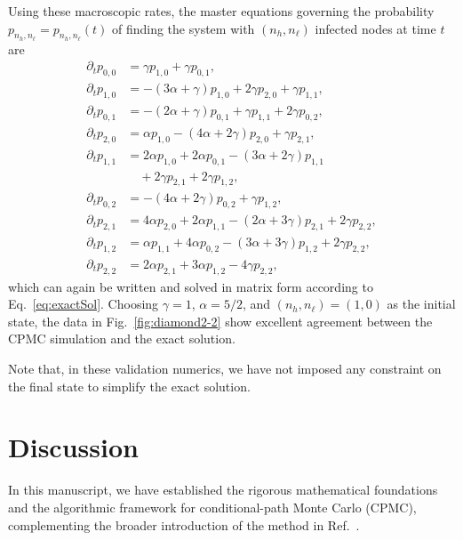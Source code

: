 \documentclass[english,10pt,aps,pra,twocolumn,superscriptaddress,floatfix,fleqn]{revtex4-2}
\begin{document}
Using these macroscopic rates, the master equations governing the probability $p_{n_h,n_\ell}=p_{n_h,n_\ell}(t)$ of finding the system with $(n_h,n_\ell)$ infected nodes at time $t$ are
\begin{align*}
	\partial_t p_{0,0} &= \gamma p_{1,0} + \gamma p_{0,1}, \\
	\partial_t p_{1,0} &= -(3\alpha + \gamma)p_{1,0} + 2\gamma p_{2,0} + \gamma p_{1,1}, \\
	\partial_t p_{0,1} &= -(2\alpha + \gamma)p_{0,1} + \gamma p_{1,1} + 2\gamma p_{0,2}, \\
	\partial_t p_{2,0} &= \alpha p_{1,0} - (4\alpha + 2\gamma)p_{2,0} + \gamma p_{2,1}, \\
	\partial_t p_{1,1} &= 2\alpha p_{1,0} + 2\alpha p_{0,1} - (3\alpha + 2\gamma)p_{1,1}\\
	&\quad+ 2\gamma p_{2,1} + 2\gamma p_{1,2}, \\
	\partial_t p_{0,2} &= -(4\alpha + 2\gamma)p_{0,2} + \gamma p_{1,2}, \\
	\partial_t p_{2,1} &= 4\alpha p_{2,0} + 2\alpha p_{1,1} - (2\alpha + 3\gamma)p_{2,1} + 2\gamma p_{2,2}, \\
	\partial_t p_{1,2} &= \alpha p_{1,1} + 4\alpha p_{0,2} - (3\alpha + 3\gamma)p_{1,2} + 2\gamma p_{2,2}, \\
	\partial_t p_{2,2} &= 2\alpha p_{2,1} + 3\alpha p_{1,2} - 4\gamma p_{2,2},
\end{align*}
which can again be written and solved in matrix form according to Eq.~\eqref{eq:exactSol}.
Choosing $\gamma=1$, $\alpha=5/2$, and $(n_h,n_\ell)=(1,0)$ as the initial state, the data in Fig.~\ref{fig:diamond2-2} show excellent agreement between the CPMC simulation and the exact solution.

Note that, in these validation numerics, we have not imposed any constraint on the final state to simplify the exact solution.



\section{Discussion}\label{sec:discuss}
In this manuscript, we have established the rigorous mathematical foundations and the algorithmic framework for conditional-path Monte Carlo (CPMC), complementing the broader introduction of the method in Ref.~\cite{Sun2026_08}.
\end{document}
